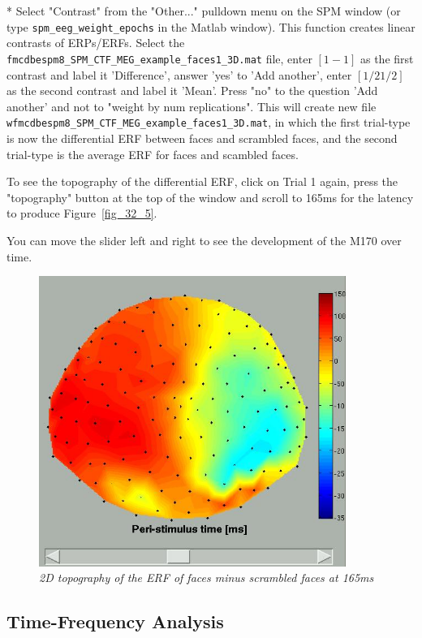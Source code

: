 * Select "Contrast" from the "Other..." pulldown menu on the SPM window (or type \verb!spm_eeg_weight_epochs! in the Matlab window). This function creates linear contrasts of ERPs/ERFs. Select the \verb!fmcdbespm8_SPM_CTF_MEG_example_faces1_3D.mat! file, enter $[1 -1]$ as the first contrast and label it 'Difference', answer 'yes' to 'Add another',  enter $[1/2 1/2]$ as the second contrast and label it 'Mean'. Press "no" to the question 'Add another' and not to "weight by num replications". This will create new file \verb!wfmcdbespm8_SPM_CTF_MEG_example_faces1_3D.mat!, in which the first trial-type is now the differential ERF between faces and scrambled faces, and the second trial-type is the average ERF for faces and scambled faces.

To see the topography of the differential ERF, click on Trial 1 again, press the "topography" button at the top of the window and scroll to 165ms for the latency to produce Figure~\ref{fig_32_5}.

You can move the slider left and right to see the development of the M170 over time.

\begin{figure}
\begin{center}
\includegraphics[width=100mm]{multimodal/figures/figure_32_12}
\caption{\em 2D topography of the ERF of faces minus scrambled faces at 165ms\label{fig_32_12}}
\end{center}
\end{figure}

\subsection{Time-Frequency Analysis}

